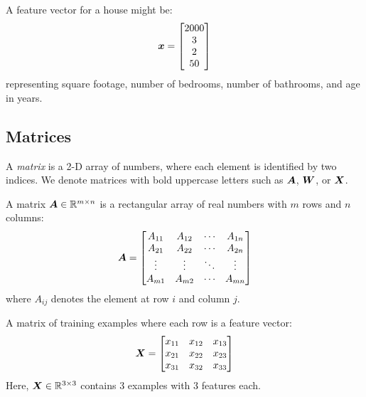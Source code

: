 \begin{example}
A feature vector for a house might be:
\begin{equation}
    \boldsymbol{x} = \begin{bmatrix} 2000 \\ 3 \\ 2 \\ 50 \end{bmatrix}
\end{equation}
representing square footage, number of bedrooms, number of bathrooms, and age in years.
\end{example}

\subsection{Matrices}

A \emph{matrix} is a 2-D array of numbers, where each element is identified by two indices. We denote matrices with bold uppercase letters such as $\boldsymbol{A}$, $\boldsymbol{W}$, or $\boldsymbol{X}$.

\begin{definition}[Matrix]
A matrix $\boldsymbol{A} \in \mathbb{R}^{m \times n}$ is a rectangular array of real numbers with $m$ rows and $n$ columns:
\begin{equation}
    \boldsymbol{A} = \begin{bmatrix}
        A_{11} & A_{12} & \cdots & A_{1n} \\
        A_{21} & A_{22} & \cdots & A_{2n} \\
        \vdots & \vdots & \ddots & \vdots \\
        A_{m1} & A_{m2} & \cdots & A_{mn}
    \end{bmatrix}
\end{equation}
where $A_{ij}$ denotes the element at row $i$ and column $j$.
\end{definition}

\begin{example}
A matrix of training examples where each row is a feature vector:
\begin{equation}
    \boldsymbol{X} = \begin{bmatrix}
        x_{11} & x_{12} & x_{13} \\
        x_{21} & x_{22} & x_{23} \\
        x_{31} & x_{32} & x_{33}
    \end{bmatrix}
\end{equation}
Here, $\boldsymbol{X} \in \mathbb{R}^{3 \times 3}$ contains 3 examples with 3 features each.
\end{example}

